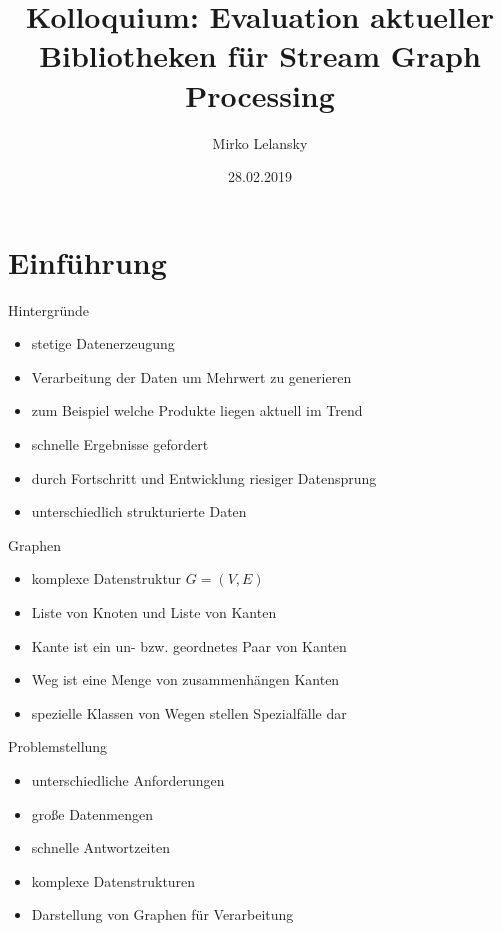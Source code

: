 \documentclass[a4paper, fontsize=11pt]{beamer}
\begin{document}
\begin{frame}
    \author{Mirko Lelansky}
    \title{Kolloquium: Evaluation aktueller Bibliotheken für Stream Graph Processing}
    \date{28.02.2019}
    \maketitle
\end{frame}

\begin{frame}
    \tableofcontents
\end{frame}

\section{Einführung}
\begin{frame}{Hintergründe}
    \begin{itemize}
        \item stetige Datenerzeugung
        \item Verarbeitung der Daten um Mehrwert zu generieren
        \item zum Beispiel welche Produkte liegen aktuell im Trend
        \item schnelle Ergebnisse gefordert
        \item durch Fortschritt und Entwicklung riesiger Datensprung
        \item unterschiedlich strukturierte Daten
    \end{itemize}
\end{frame}

\begin{frame}{Graphen}
    \begin{itemize}
        \item komplexe Datenstruktur $ G = (V,E)$
        \item Liste von Knoten und Liste von Kanten
        \item Kante ist ein un- bzw. geordnetes Paar von Kanten
        \item Weg ist eine Menge von zusammenhängen Kanten
        \item spezielle Klassen von Wegen stellen Spezialfälle dar
    \end{itemize}
\end{frame}

\begin{frame}{Problemstellung}
    \begin{itemize}
        \item unterschiedliche Anforderungen
        \item große Datenmengen
        \item schnelle Antwortzeiten
        \item komplexe Datenstrukturen
        \item Darstellung von Graphen für Verarbeitung
    \end{itemize}
\end{frame}
\end{document}
